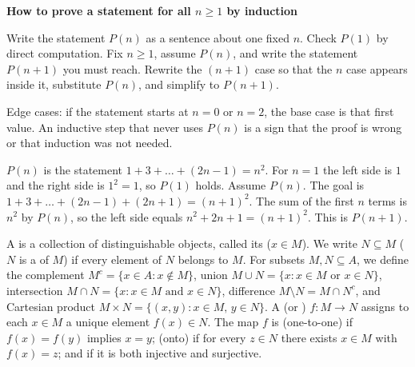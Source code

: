 \documentclass[10pt]{scrartcl}
\newenvironment{methodbox}[1]{\begin{mdframed}[style=methodstyle]\textbf{\color{NavyBlue}#1}\par\vspace{2pt}}{\end{mdframed}}
\begin{document}
\begin{methodbox}{How to prove a statement for all $n\ge 1$ by induction}
  \begin{steps}
    \ii Write the statement $P(n)$ as a sentence about one fixed $n$.
    \ii Check $P(1)$ by direct computation.
    \ii Fix $n\ge 1$, assume $P(n)$, and write the statement $P(n+1)$ you must reach.
    \ii Rewrite the $(n+1)$ case so that the $n$ case appears inside it, substitute $P(n)$, and simplify to $P(n+1)$.
  \end{steps}
  Edge cases: if the statement starts at $n=0$ or $n=2$, the base case is that first value. An inductive step that never uses $P(n)$ is a sign that the proof is wrong or that induction was not needed.
\end{methodbox}

\begin{example*}[An induction proof: $1+3+\dots+(2n-1)=n^2$]
  \begin{steps}
    \ii $P(n)$ is the statement $1+3+\dots+(2n-1)=n^2$.
    \ii For $n=1$ the left side is $1$ and the right side is $1^2=1$, so $P(1)$ holds.
    \ii Assume $P(n)$. The goal is $1+3+\dots+(2n-1)+(2n+1)=(n+1)^2$.
    \ii The sum of the first $n$ terms is $n^2$ by $P(n)$, so the left side equals $n^2+2n+1=(n+1)^2$. This is $P(n+1)$.
  \end{steps}
\end{example*}

\begin{definition*}
  \begin{itemize}
    \ii A  is a collection of distinguishable objects, called its  ($x\in M$). We write $N\subseteq M$ ($N$ is a  of $M$) if every element of $N$ belongs to $M$. For subsets $M,N\subseteq A$, we define the complement $M^c=\{x\in A:x\notin M\}$, union $M\cup N=\{x:x\in M\text{ or }x\in N\}$, intersection $M\cap N=\{x:x\in M\text{ and }x\in N\}$, difference $M\setminus N=M\cap N^c$, and Cartesian product $M\times N=\{(x,y):x\in M,\,y\in N\}$.
    \ii A  (or ) $f\colon M\to N$ assigns to each $x\in M$ a unique element $f(x)\in N$. The map $f$ is  (one-to-one) if $f(x)=f(y)$ implies $x=y$;  (onto) if for every $z\in N$ there exists $x\in M$ with $f(x)=z$; and  if it is both injective and surjective.
  \end{itemize}
\end{definition*}
\end{document}
